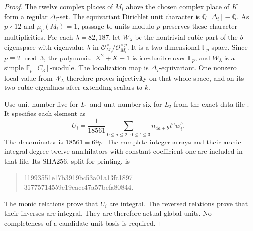 \begin{proof}
The twelve complex places of $M_i$ above the chosen complex place
of $K$ form a regular $\Delta_i$-set.
The equivariant Dirichlet unit character is
$\mathbb Q[\Delta_i]-\mathbb Q$.
As $p\nmid12$ and $\mu_p(M_i)=1$, passage to units modulo $p$
preserves these character multiplicities.
For each $\lambda=82,187$, let $W_\lambda$ be the nontrivial
cubic part of the $b$-eigenspace with eigenvalue $\lambda$
in $\mathcal O_{M_i}^\times/\mathcal O_{M_i}^{\times p}$.
It is a two-dimensional $\mathbb F_p$-space.
Since $p\equiv2\bmod3$, the polynomial $X^2+X+1$ is
irreducible over $\mathbb F_p$, and $W_\lambda$ is a simple
$\mathbb F_p[C_3]$-module.
The localization map is $\Delta_i$-equivariant.
One nonzero local value from $W_\lambda$ therefore proves
injectivity on that whole space, and on its two cubic eigenlines
after extending scalars to $k$.

Use unit number five for $L_1$ and unit number six for $L_2$
from the exact data file
.
It specifies each element as
\[
         U_i=\frac{1}{18561}
           \sum_{0\leq a\leq2,\ 0\leq b\leq3}
                           n_{4a+b}\,t^a w_i^b .
 \tag{C16Q.23}
\]
The denominator is $18561=69p$.
The complete integer arrays and their monic integral
degree-twelve annihilators with constant coefficient one
are included in that file.  Its SHA256, split for printing, is
\begin{quote}\ttfamily\small
11993551e17b3919bc53a01a13fc1897\\
36775714559c19eacc47a57befa80844.
\end{quote}
The monic relations prove that $U_i$ are integral.
The reversed relations prove that their inverses are integral.
They are therefore actual global units.
No completeness of a candidate unit basis is required.


\end{proof}
